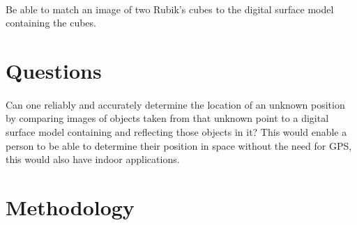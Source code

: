 \documentclass{article}
\begin{document}
\paragraph{}
Be able to match an image of two Rubik's cubes to the digital surface model containing the cubes.

\section{Questions}
\paragraph{}
Can one reliably and accurately determine the location of an unknown position by comparing images of objects taken from that unknown point to a digital surface model containing and reflecting those objects in it? This would enable a person to be able to determine their position in space without the need for GPS, this would also have indoor applications.


\section{Methodology}
\end{document}

